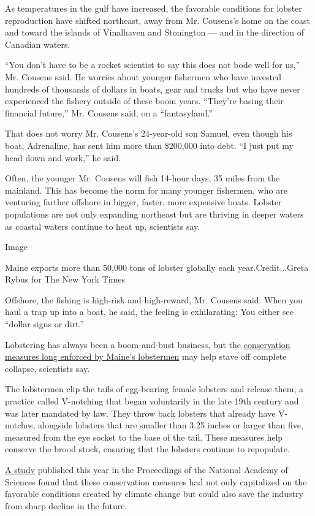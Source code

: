 As temperatures in the gulf have increased, the favorable conditions for
lobster reproduction have shifted northeast, away from Mr. Cousens's
home on the coast and toward the islands of Vinalhaven and Stonington
--- and in the direction of Canadian waters.

``You don't have to be a rocket scientist to say this does not bode well
for us,'' Mr. Cousens said. He worries about younger fishermen who have
invested hundreds of thousands of dollars in boats, gear and trucks but
who have never experienced the fishery outside of these boom years.
``They're basing their financial future,'' Mr. Cousens said, on a
``fantasyland.''

That does not worry Mr. Cousens's 24-year-old son Samuel, even though
his boat, Adrenaline, has sent him more than \$200,000 into debt. ``I
just put my head down and work,'' he said.

Often, the younger Mr. Cousens will fish 14-hour days, 35 miles from the
mainland. This has become the norm for many younger fishermen, who are
venturing farther offshore in bigger, faster, more expensive boats.
Lobster populations are not only expanding northeast but are thriving in
deeper waters as coastal waters continue to heat up, scientists say.

Image

Maine exports more than 50,000 tons of lobster globally each
year.Credit...Greta Rybus for The New York Times

Offshore, the fishing is high-risk and high-reward, Mr. Cousens said.
When you haul a trap up into a boat, he said, the feeling is
exhilarating: You either see ``dollar signs or dirt.''

Lobstering has always been a boom-and-bust business, but the
\href{http://www.maine.gov/dmr/science-research/species/lobster/guide/index.html}{conservation
measures long enforced by Maine's lobstermen} may help stave off
complete collapse, scientists say.

The lobstermen clip the tails of egg-bearing female lobsters and release
them, a practice called V-notching that began voluntarily in the late
19th century and was later mandated by law. They throw back lobsters
that already have V-notches, alongside lobsters that are smaller than
3.25 inches or larger than five, measured from the eye socket to the
base of the tail. These measures help conserve the brood stock, ensuring
that the lobsters continue to repopulate.

\href{http://www.pnas.org/content/early/2018/01/12/1711122115}{A study}
published this year in the Proceedings of the National Academy of
Sciences found that these conservation measures had not only capitalized
on the favorable conditions created by climate change but could also
save the industry from sharp decline in the future.

